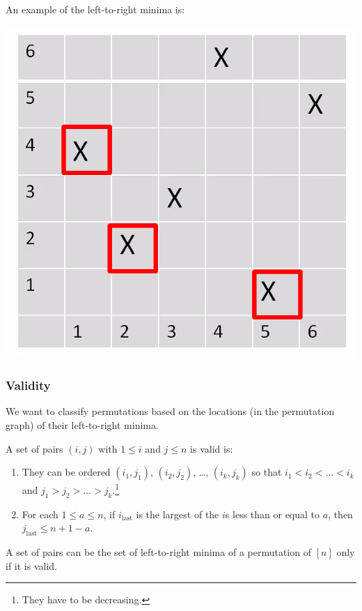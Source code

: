 \documentclass[letterpaper]{article}
\begin{document}
An example of the left-to-right minima is:
\begin{center}
    \includegraphics[scale=0.4]{selected_perm.PNG}
\end{center}

\subsubsection{Validity}
We want to classify permutations based on the locations (in the permutation graph) of their left-to-right minima.
\begin{definition}{}{}
    A set of pairs $(i, j)$ with $1 \leq i$ and $j \leq n$ is valid is:
    \begin{enumerate}
        \item They can be ordered $(i_1, j_1)$, $(i_2, j_2)$, \dots, $(i_k, j_k)$ so that $i_1 < i_2 < \dots < i_k$ and $j_1 > j_2 > \dots > j_k$.\footnote{They have to be decreasing.}
        \item For each $1 \leq a \leq n$, if $i_{\text{last}}$ is the largest of the $i$s less than or equal to $a$, then $j_{\text{last}} \leq n + 1 - a$.
    \end{enumerate}
\end{definition}

\begin{lemma}{}{}
    A set of pairs can be the set of left-to-right minima of a permutation of $[n]$ only if it is valid. 
\end{lemma}
\end{document}
